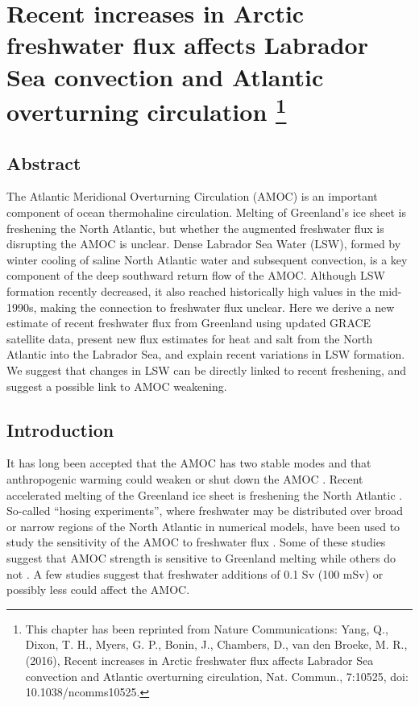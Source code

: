 \chapter[Recent increases in Arctic freshwater flux affects Labrador Sea convection and Atlantic overturning circulation]{Recent increases in Arctic freshwater flux affects Labrador Sea convection and Atlantic overturning circulation \footnote{This chapter has been reprinted from Nature Communications: Yang, Q., Dixon, T. H., Myers, G. P., Bonin, J., Chambers, D., van den Broeke, M. R., (2016), Recent increases in Arctic freshwater flux affects Labrador Sea convection and Atlantic overturning circulation, Nat. Commun., 7:10525, doi: 10.1038/ncomms10525.}}

\section{Abstract}
The Atlantic Meridional Overturning Circulation (AMOC) is an important component of ocean thermohaline circulation.  Melting of Greenland’s ice sheet is freshening the North Atlantic, but whether the augmented freshwater flux is disrupting the AMOC is unclear.  Dense Labrador Sea Water (LSW), formed by winter cooling of saline North Atlantic water and subsequent convection, is a key component of the deep southward return flow of the AMOC.  Although LSW formation recently decreased, it also reached historically high values in the mid-1990s, making the connection to freshwater flux unclear.   Here we derive a new estimate of recent freshwater flux from Greenland using updated GRACE satellite data, present new flux estimates for heat and salt from the North Atlantic into the Labrador Sea, and explain recent variations in LSW formation.  We suggest that changes in LSW can be directly linked to recent freshening, and suggest a possible link to AMOC weakening.

\section{Introduction}
It has long been accepted that the AMOC has two stable modes \cite[]{stommel1961,rooth1982,broecker1985} and that anthropogenic warming could weaken or shut down the AMOC \cite[]{broecker1987,wood1999}.  Recent accelerated melting of the Greenland ice sheet is freshening the North Atlantic \cite[]{jiang2010,rignot2011,enderlin2014,velicogna2014regional,yang2013}.  So-called “hosing experiments”, where freshwater may be distributed over broad or narrow regions of the North Atlantic in numerical models, have been used to study the sensitivity of the AMOC to freshwater flux \cite{fichefet2003,jungclaus2006,stouffer2006,hu2011,swingedow2013,ridley2005,brunnabend2015}.  Some of these studies suggest that AMOC strength is sensitive to Greenland melting \cite[]{fichefet2003,brunnabend2015} while others do not \cite[]{jungclaus2006,hu2011,ridley2005}.  A few studies suggest that freshwater additions of 0.1 Sv (100 mSv) \cite[]{rahmstorf1995,rahmstorf2005,hawkins2011} or possibly less \cite[]{fichefet2003,brunnabend2015}could affect the AMOC. 

